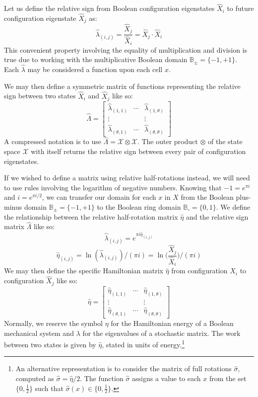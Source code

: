 \documentclass[10pt, a5paper, twoside, openright]{memoir}
\begin{document}
Let us define the relative sign from Boolean configuration eigenstates $\hat X_i$ to future configuration eigenstate $\hat X_j$ as: 
$$\hat \lambda_{(i,j)} = \frac{\hat X_j}{\hat X_i} = \hat X_j \cdot \hat X_i$$
This convenient property involving the equality of multiplication and division is true due to working with the multiplicative Boolean domain $\mathbb B_\pm =\{-1, +1\}$. Each $\hat \lambda$ may be considered a function upon each cell $x$.

We may then define a symmetric matrix of functions representing the relative sign between two states $\hat X_i$ and $\hat X_j$ like so:
$$\hat \Lambda = 
\begin{bmatrix}
\hat \lambda_{(1,1)} & \cdots & \hat \lambda_{(1,\theta)} \\
\vdots & & \vdots \\
\hat \lambda_{(\theta,1)} & \cdots & \hat \lambda_{(\theta,\theta)}
\end{bmatrix}
$$
A compressed notation is to use $\hat \Lambda = \mathcal X \otimes \mathcal X$. The outer product $\otimes$ of the state space $\mathcal X$ with itself returns the relative sign between every pair of configuration eigenstates.

If we wished to define a matrix using relative half-rotations instead, we will need to use rules involving the logarithm of negative numbers. Knowing that $-1 = e^{\pi i}$ and $i = e^{\pi i / 2}$, we can transfer our domain for each $x$ in $X$ from the Boolean plus-minus domain $\mathbb B_\pm = \{-1, +1\}$ to the Boolean ring domain $\mathbb B_\circ = \{0, 1\}$. We define the relationship between the relative half-rotation matrix $\hat \eta$ and the relative sign matrix $\hat \Lambda$ like so:
$$\hat \lambda_{(i,j)} = e^{\pi i \hat \eta_{(i,j)}}$$
$$\hat \eta_{(i,j)} = \ln(\hat \lambda_{(i,j)}) / (\pi i) = \ln \bigg (\frac{\hat X_j}{\hat X_i} \bigg ) / (\pi i)$$
We may then define the specific Hamiltonian matrix $\hat \eta$ from configuration $\hat X_i$ to configuration $\hat X_j$ like so:
$$\hat \eta = 
\begin{bmatrix}
\hat \eta_{(1,1)} & \cdots & \hat \eta_{(1,\theta)} \\
\vdots & & \vdots \\
\hat \eta_{(\theta,1)} & \cdots & \hat \eta_{(\theta,\theta)}
\end{bmatrix}
$$
Normally, we reserve the symbol $\eta$ for the Hamiltonian energy of a Boolean mechanical system and $\lambda$ for the eigenvalues of a stochastic matrix. The work between two states is given by $\hat \eta$, stated in units of energy.\footnote{An alternative representation is to consider the matrix of full rotations $\hat \sigma$, computed as $\hat \sigma = \hat \eta / 2$. The function $\hat \sigma$ assigns a value to each $x$ from the set $\{0, \frac{1}{2}\}$ such that $\hat \sigma (x)\in \{0, \frac{1}{2}\}$.}
\end{document}
